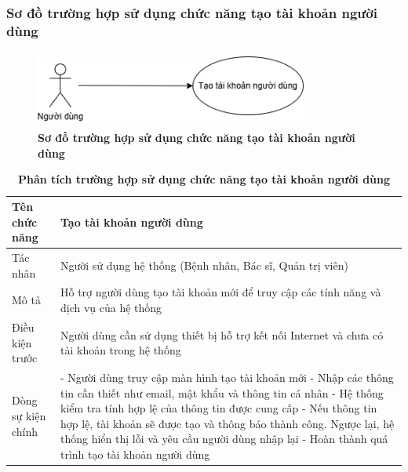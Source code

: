 \subsubsection{Sơ đồ trường hợp sử dụng chức năng tạo tài khoản người dùng}

\begin{figure}[H]
	\centering
	\includegraphics[width=9cm,height=2.5cm]{Images/use_case/use_case_register.png}
	\caption[Sơ đồ trường hợp sử dụng chức năng tạo tài khoản người dùng của hệ thống]{\bfseries \fontsize{12pt}{0pt}
		\selectfont Sơ đồ trường hợp sử dụng chức năng tạo tài khoản người dùng}
	\label{use_case_register} %
\end{figure}

\begin{table}[H]
	\caption{\bfseries \fontsize{12pt}{0pt}\selectfont Phân tích trường hợp sử dụng chức năng tạo tài khoản người dùng}
	\centering
	\begin{tabularx}{\textwidth}{|X|X|}
		\hline
		\textbf{Tên chức năng} & \textbf{Tạo tài khoản người dùng}                                                           \\
		\hline
		Tác nhân               & Người sử dụng hệ thống (Bệnh nhân, Bác sĩ, Quản trị viên)                                   \\
		\hline
		Mô tả                  & Hỗ trợ người dùng tạo tài khoản mới để truy cập các tính năng và dịch vụ của hệ thống       \\
		\hline
		Điều kiện trước        & Người dùng cần sử dụng thiết bị hỗ trợ kết nối Internet và chưa có tài khoản trong hệ thống \\
		\hline
		Dòng sự kiện chính     &
		- Người dùng truy cập màn hình tạo tài khoản mới \newline
		- Nhập các thông tin cần thiết như email, mật khẩu và thông tin cá nhân \newline
		- Hệ thống kiểm tra tính hợp lệ của thông tin được cung cấp \newline
		- Nếu thông tin hợp lệ, tài khoản sẽ được tạo và thông báo thành công. Ngược lại, hệ thống hiển thị lỗi và yêu cầu người dùng nhập lại \newline
		- Hoàn thành quá trình tạo tài khoản người dùng                                                                      \\
		\hline
	\end{tabularx}
\end{table}

